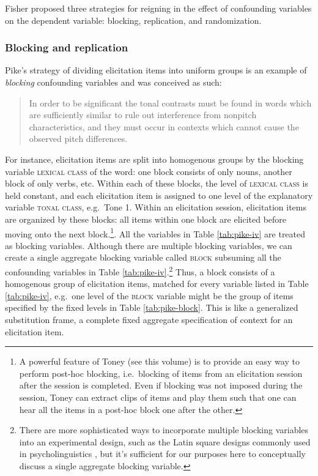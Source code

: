 \documentclass[12pt]{article}
\begin{document}
Fisher proposed three strategies for reigning in the effect of
confounding variables on the dependent variable: blocking,
replication, and randomization.

\subsubsection{Blocking and replication}
\label{sec:blocking}

Pike's strategy of dividing elicitation items into uniform groups is
an example of \textit{blocking} confounding variables and was
conceived as such:

\begin{quote}  
\textsf{\small{In order to be significant the tonal contrasts must be
found in words which are sufficiently similar to rule out interference
from nonpitch characteristics, and they must occur in contexts which
cannot cause the observed pitch differences. \citep[p.\
48]{Pike:1948}}}
\end{quote}

For instance, elicitation items are split into homogenous groups by
the blocking variable \textsc{lexical class} of the word: one block
consists of only nouns, another block of only verbs, etc. Within each
of these blocks, the level of \textsc{lexical class} is held constant,
and each elicitation item is assigned to one level of the explanatory
variable \textsc{tonal class}, e.g.\ Tone 1. Within an elicitation
session, elicitation items are organized by these blocks: all items
within one block are elicited before moving onto the next block.\footnote{A powerful
  feature of Toney (see this volume) is to provide an easy way to
  perform post-hoc blocking, i.e.\ blocking of items from an
  elicitation session after the session is completed. Even if blocking
was not imposed during the session, Toney can extract clips of items
and play them such that one can hear all the items in a post-hoc block
one after the other.}.    All the variables in
Table \ref{tab:pike-iv} are treated as blocking variables. Although there
are multiple blocking variables, we can create a single aggregate blocking
variable called \textsc{block} subsuming all the
confounding variables in Table \ref{tab:pike-iv}.\footnote{There are
  more sophisticated ways to incorporate multiple blocking variables
  into an experimental design, such as the Latin square designs
  commonly used in psycholinguistics
  \citep[p.\ 136--142]{Montgomery:2005}, but
  it's sufficient for our purposes here to conceptually discuss a single aggregate
  blocking variable.} Thus, a block
consists of a homogenous group of elicitation items, matched for every
variable listed in Table \ref{tab:pike-iv}, e.g.\ one level of the
\textsc{block} variable might be the group of items
specified by the fixed levels in Table \ref{tab:pike-block}. This is
like a generalized substitution frame, a complete fixed aggregate
specification of context for an elicitation item.
\end{document}
